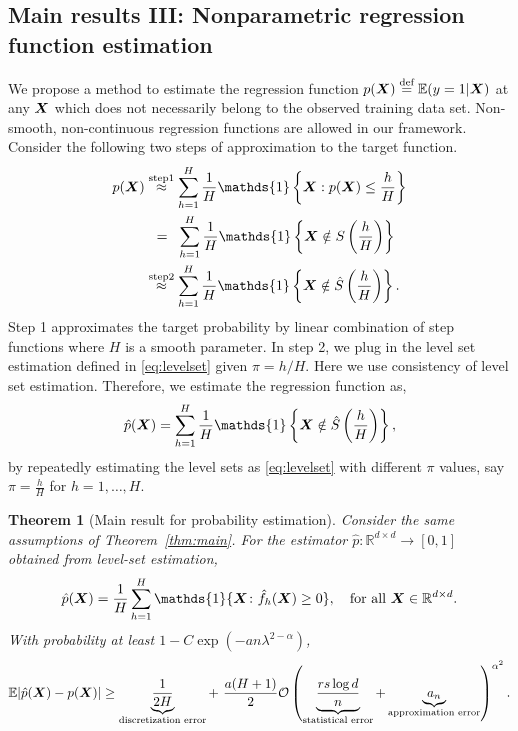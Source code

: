 \documentclass[mathptm]{statsoc}
\newcommand*{\KeepStyleUnderBrace}[1]{%
\mathop{%
\mathchoice
{\underbrace{\displaystyle#1}}%
{\underbrace{\textstyle#1}}%
{\underbrace{\scriptstyle#1}}%
{\underbrace{\scriptscriptstyle#1}}%
}\limits
}
\newtheorem{thm}{Theorem}[section]
\begin{document}
\subsection{Main results III: Nonparametric regression function estimation}
\label{subsec:pb3}
We propose a method to estimate  the regression function $p(\bm X)\stackrel{\text{def}}{=}\mathbb{E}(y = 1|\bm X)$ at any $\bm X$ which does not necessarily belong to the observed training data set. Non-smooth, non-continuous regression functions are allowed in our framework. Consider the following two steps of approximation to the target function.
\begin{align}
\label{eq:approx}
p(\mX) &\stackrel{\text{step1}}{\approx} \sum_{h=1}^H\frac{1}{H}\mathds{1}\left\{\mX: p(\mX)\leq\frac{h}{H}\right\}\\&\hspace{.2cm}=\hspace{.2cm} \sum_{h=1}^H\frac{1}{H}\mathds{1}\left\{\mX\notin S\left(\frac{h}{H}\right)\right\}
\\&\stackrel{\text{step2}}{\approx} \sum_{h=1}^H\frac{1}{H}\mathds{1}\left\{\mX\notin\hat S\left(\frac{h}{H}\right)\right\}.
\end{align}
Step 1 approximates the target probability by linear combination of step functions where $H$ is a smooth parameter. In step 2, we plug in the level set estimation defined in \eqref{eq:levelset} given $\pi = h/H$. Here we use consistency of level set estimation.
Therefore, we estimate the regression function as,\begin{align}
\hat p(\mX) = \sum_{h=1}^H\frac{1}{H}\mathds{1}\left\{\mX\notin\hat S\left(\frac{h}{H}\right)\right\},
\end{align}
by repeatedly estimating the level sets as \eqref{eq:levelset} with different $\pi$ values, say  $\pi = \frac{h}{H}$ for $h = 1,\ldots, H$. 



\begin{thm}[Main result for probability estimation] Consider the same assumptions of Theorem~\ref{thm:main}. For the estimator $\hat p\colon \mathbb{R}^{d\times d}\to[0,1]$ obtained from level-set estimation,
\[
\hat p(\mX)={1\over H}\sum_{h=1}^H \mathds{1}\{\mX\colon \hat f_h(\mX)\geq 0\},\quad \text{for all }\mX\in\mathbb{R}^{d\times d}.
\]
With probability at least $1-C\exp(-an\lambda^{2-\alpha})$,
\[
\mathbb{E}|\hat p(\mX)- p(\mX)| \geq \KeepStyleUnderBrace{{1\over 2H}}_{\text{discretization error}} +\ {a(H+1)\over 2} \tO\left(\KeepStyleUnderBrace{{rs\log d\over n}}_{\text{statistical error}} +\KeepStyleUnderBrace{a_n}_{\text{approximation error}}\right)^{\alpha^2}.
\]
\end{thm}
\end{document}

